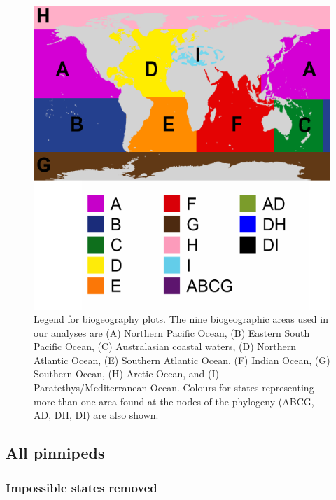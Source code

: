 \documentclass[a4paper, 12pt]{article}
\begin{document}
\begin{figure}[H]
 \centering
  \includegraphics[width = 0.5\linewidth]{figures/BGB-legend.pdf}
  \caption{Legend for biogeography plots. The nine biogeographic areas used in our analyses are (A) Northern Pacific Ocean, (B) Eastern South Pacific Ocean, (C) Australasian coastal waters, (D) Northern Atlantic Ocean, (E) Southern Atlantic Ocean, (F) Indian Ocean, (G) Southern Ocean, (H) Arctic Ocean, and (I) Paratethys/Mediterranean Ocean. Colours for states representing more than one area found at the nodes of the phylogeny (ABCG, AD, DH, DI) are also shown.}
  \label{fig-legend}
\end{figure} 

\subsection{All pinnipeds}
\subsubsection{Impossible states removed}
\end{document}

